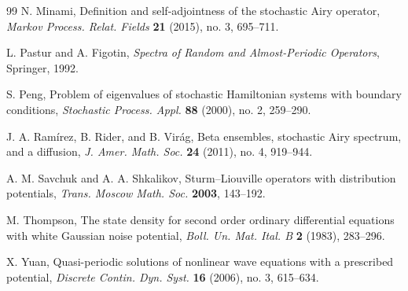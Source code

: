 \documentclass[11pt]{article}
\begin{document}
\begin{thebibliography}{99}
N. Minami,
\newblock Definition and self-adjointness of the stochastic Airy operator,
\newblock \emph{Markov Process. Relat. Fields} \textbf{21} (2015), no. 3, 695--711.

L. Pastur and A. Figotin,
\newblock \emph{Spectra of Random and Almost-Periodic Operators},
\newblock Springer, 1992.

S. Peng,
\newblock Problem of eigenvalues of stochastic Hamiltonian systems with boundary conditions,
\newblock \emph{Stochastic Process. Appl.} \textbf{88} (2000), no. 2, 259--290.

J. A. Ram\'irez, B. Rider, and B. Vir\'ag,
\newblock Beta ensembles, stochastic Airy spectrum, and a diffusion,
\newblock \emph{J. Amer. Math. Soc.} \textbf{24} (2011), no. 4, 919--944.

A. M. Savchuk and A. A. Shkalikov,
\newblock Sturm--Liouville operators with distribution potentials,
\newblock \emph{Trans. Moscow Math. Soc.} \textbf{2003}, 143--192.

M. Thompson,
\newblock The state density for second order ordinary differential equations with white Gaussian noise potential,
\newblock \emph{Boll. Un. Mat. Ital. B} \textbf{2} (1983), 283--296.

X. Yuan,
\newblock Quasi-periodic solutions of nonlinear wave equations with a prescribed potential,
\newblock \emph{Discrete Contin. Dyn. Syst.} \textbf{16} (2006), no. 3, 615--634.

\end{thebibliography}
\end{document}
